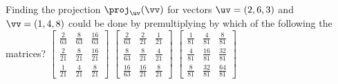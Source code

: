 \begin{activity}
Finding the projection \(\proj_\uv(\vv)\) for vectors \(\uv=(2,6,3)\) and \(\vv=(1,4,8)\) could be done by premultiplying by which of the following the matrices?
{\(\begin{bmatrix} \frac{2}{63}&\frac{8}{63}&\frac{16}{63}
\\\frac{2}{21}&\frac{8}{21}&\frac{16}{21}
\\\frac{1}{21}&\frac{4}{21}&\frac{8}{21} \end{bmatrix}\)}
{\(\begin{bmatrix} \frac{2}{63}&\frac{2}{21}&\frac{1}{21}
\\\frac{8}{63}&\frac{8}{21}&\frac{4}{21}
\\\frac{16}{63}&\frac{16}{21}&\frac{8}{21} \end{bmatrix}\)}{
\(\begin{bmatrix} \frac{1}{81}&\frac{4}{81}&\frac{8}{81}
\\\frac{4}{81}&\frac{16}{81}&\frac{32}{81}
\\\frac{8}{81}&\frac{32}{81}&\frac{64}{81} \end{bmatrix}\)}
\end{activity}





